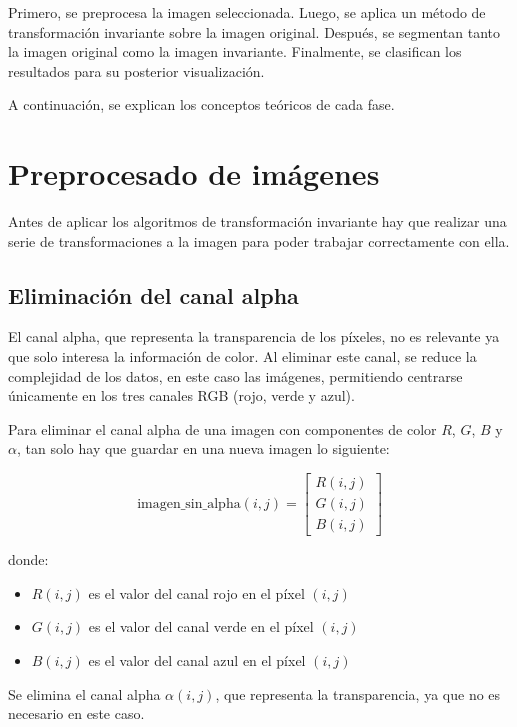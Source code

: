 
Primero, se preprocesa la imagen seleccionada. Luego, se aplica un método de transformación invariante sobre la imagen original. Después, se segmentan tanto la imagen original como la imagen invariante. Finalmente, se clasifican los resultados para su posterior visualización.

A continuación, se explican los conceptos teóricos de cada fase.

\section{Preprocesado de imágenes}\label{preprocesado}

Antes de aplicar los algoritmos de transformación invariante hay que realizar una serie de transformaciones a la imagen para poder trabajar correctamente con ella.

\subsection{Eliminación del canal alpha}\label{eliminación-del-canal-alpha}

El canal alpha, que representa la transparencia de los píxeles, no es relevante ya que solo interesa la información de color. Al eliminar este canal, se reduce la complejidad de los datos, en este caso las imágenes, permitiendo centrarse únicamente en los tres canales RGB (rojo, verde y azul).

Para eliminar el canal alpha de una imagen con componentes de color $R$, $G$, $B$ y $\alpha$, tan solo hay que guardar en una nueva imagen lo siguiente:

$$\text{imagen\_sin\_alpha}(i, j) = 
\begin{bmatrix} R(i, j) \\ G(i, j) \\ B(i, j)\end{bmatrix}$$

donde:

\begin{itemize}
  \item $R(i, j)$ es el valor del canal rojo en el píxel $(i, j)$
  \item $G(i, j)$ es el valor del canal verde en el píxel $(i, j)$
  \item $B(i, j)$ es el valor del canal azul en el píxel $(i, j)$
\end{itemize}

Se elimina el canal alpha $\alpha(i, j)$, que representa la transparencia, ya que no es necesario en este caso.

